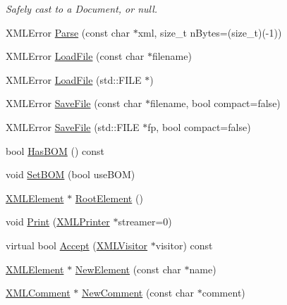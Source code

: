 \begin{DoxyCompactItemize}
\begin{DoxyCompactList}\small\item\em Safely cast to a Document, or null. \end{DoxyCompactList}\item 
X\-M\-L\-Error \hyperlink{classtinyxml2_1_1_x_m_l_document_a2c64c538f4864dcd02dadf11c979dc67}{Parse} (const char $\ast$xml, size\-\_\-t n\-Bytes=(size\-\_\-t)(-\/1))
\item 
X\-M\-L\-Error \hyperlink{classtinyxml2_1_1_x_m_l_document_aba2c0a9f5a9cc5860565525213fa6c9f}{Load\-File} (const char $\ast$filename)
\item 
X\-M\-L\-Error \hyperlink{classtinyxml2_1_1_x_m_l_document_a0b8bf55f6b2fca9fc92329eedbc4036f}{Load\-File} (std\-::\-F\-I\-L\-E $\ast$)
\item 
X\-M\-L\-Error \hyperlink{classtinyxml2_1_1_x_m_l_document_a5021ecc6b314578455c6838f5c744a84}{Save\-File} (const char $\ast$filename, bool compact=false)
\item 
X\-M\-L\-Error \hyperlink{classtinyxml2_1_1_x_m_l_document_a0808b5398de511b033d723754891ca38}{Save\-File} (std\-::\-F\-I\-L\-E $\ast$fp, bool compact=false)
\item 
bool \hyperlink{classtinyxml2_1_1_x_m_l_document_a28a3f394d97ae1f0bccaa57bcd0ac088}{Has\-B\-O\-M} () const 
\item 
void \hyperlink{classtinyxml2_1_1_x_m_l_document_abd77461e940a450933e68f2098258349}{Set\-B\-O\-M} (bool use\-B\-O\-M)
\item 
\hyperlink{classtinyxml2_1_1_x_m_l_element}{X\-M\-L\-Element} $\ast$ \hyperlink{classtinyxml2_1_1_x_m_l_document_a7f6a17734abe87bcd69815b8d02b5220}{Root\-Element} ()
\item 
void \hyperlink{classtinyxml2_1_1_x_m_l_document_aa2caf31f58ddffa9d587c48c455720aa}{Print} (\hyperlink{classtinyxml2_1_1_x_m_l_printer}{X\-M\-L\-Printer} $\ast$streamer=0)
\item 
virtual bool \hyperlink{classtinyxml2_1_1_x_m_l_document_a66d46e7527ec62912b49400b27137eba}{Accept} (\hyperlink{classtinyxml2_1_1_x_m_l_visitor}{X\-M\-L\-Visitor} $\ast$visitor) const 
\item 
\hyperlink{classtinyxml2_1_1_x_m_l_element}{X\-M\-L\-Element} $\ast$ \hyperlink{classtinyxml2_1_1_x_m_l_document_ab1a197e87f6ac3f7333cf601510ccaaf}{New\-Element} (const char $\ast$name)
\item 
\hyperlink{classtinyxml2_1_1_x_m_l_comment}{X\-M\-L\-Comment} $\ast$ \hyperlink{classtinyxml2_1_1_x_m_l_document_a301d758e7b1a00939b868584099c1450}{New\-Comment} (const char $\ast$comment)

\end{DoxyCompactItemize}
